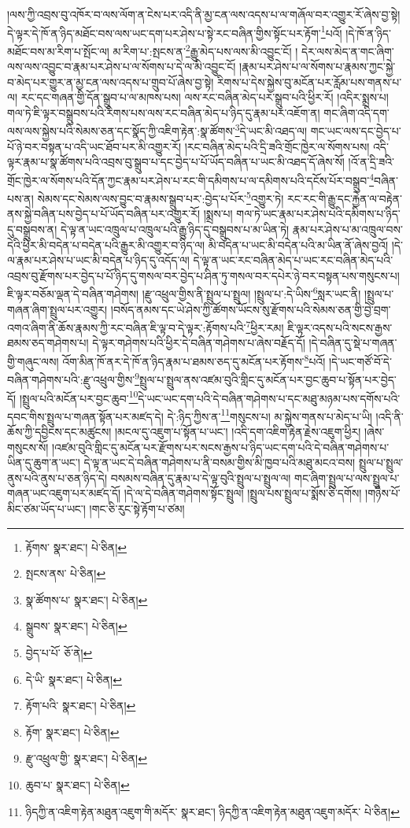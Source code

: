 །ལས་ཀྱི་འབྲས་བུ་འཁོར་བ་ལས་ལོག་ན་ངེས་པར་འདི་ནི་མྱ་ངན་ལས་འདས་པ་ལ་གཞོལ་བར་འགྱུར་རོ་ཞེས་བྱ་སྟེ། དེ་ལྟར་དེ་ཁོ་ན་ཉིད་མཐོང་བས་ལས་ཡང་དག་པར་ཤེས་པ་སྟེ་རང་བཞིན་གྱིས་སྟོང་པར་རྟོག་\footnote{རྟོགས་  སྣར་ཐང་།  པེ་ཅིན། }པའོ། །དེ་ཁོ་ན་ཉིད་མཐོང་བས་མ་རིག་པ་སྤོང་ལ། མ་རིག་པ་:སྤངས་ན་\footnote{སྤངས་ནས་  པེ་ཅིན། }རྒྱུ་མེད་པས་ལས་མི་འབྱུང་ངོ། །
དེར་ལས་མེད་ན་གང་ཞིག་ལས་ལས་འབྱུང་བ་རྣམ་པར་ཤེས་པ་ལ་སོགས་པ་དེ་ལ་མི་འབྱུང་ངོ། །རྣམ་པར་ཤེས་པ་ལ་སོགས་པ་རྣམས་ཀྱང་སྐྱེ་བ་མེད་པར་གྱུར་ན་མྱ་ངན་ལས་འདས་པ་གྲུབ་པོ་ཞེས་བྱ་སྟེ། རིགས་པ་དེས་སྐྱེས་བུ་མངོན་པར་རློམ་པས་གནས་པ་ལ། རང་དང་གཞན་གྱི་དོན་སྒྲུབ་པ་ལ་མཁས་པས། ལས་རང་བཞིན་མེད་པར་སྒྲུབ་པའི་ཕྱིར་རོ། །འདིར་སྨྲས་པ། གལ་ཏེ་ཇི་ལྟར་བསྒྲུབས་པའི་རིགས་པས་ལས་རང་བཞིན་མེད་པ་ཉིད་དུ་རྣམ་པར་འཇོག་ན། གང་ཞིག་འདི་དག་ལས་ལས་སྐྱེས་པའི་སེམས་ཅན་དང་སྣོད་ཀྱི་འཇིག་རྟེན་:སྣ་ཚོགས་\footnote{སྣ་ཚོགས་པ་  སྣར་ཐང་།  པེ་ཅིན། }དེ་ཡང་མི་འཐད་ལ། གང་ཡང་ལས་དང་བྱེད་པ་པོ་ཉེ་བར་བསྟན་པ་འདི་ཡང་ཐོབ་པར་མི་འགྱུར་རོ། །རང་བཞིན་མེད་པའི་དྲི་ཟའི་གྲོང་ཁྱེར་ལ་སོགས་པས། འདི་ལྟར་རྣམ་པ་སྣ་ཚོགས་པའི་འབྲས་བུ་སྒྲུབ་པ་དང་བྱེད་པ་པོ་ཡོད་བཞིན་པ་ཡང་མི་འཐད་དོ་ཞེས་སོ། །འོ་ན་དྲི་ཟའི་གྲོང་ཁྱེར་ལ་སོགས་པའི་དོན་ཀྱང་རྣམ་པར་ཤེས་པ་རང་གི་དམིགས་པ་ལ་དམིགས་པའི་དངོས་པོར་བསྒྲུབ་\footnote{སྒྲུབས་  སྣར་ཐང་།  པེ་ཅིན། }བཞིན་པས་ན། སེམས་དང་སེམས་ལས་བྱུང་བ་རྣམས་སྒྲུབ་པར་:བྱེད་པ་པོར་\footnote{བྱེད་པ་པོ་  ཅོ་ནེ། }འགྱུར་ཏེ། རང་རང་གི་རྒྱུ་དང་རྐྱེན་ལ་བརྟེན་ནས་སྐྱེ་བཞིན་པས་བྱེད་པ་པོ་ཡོད་བཞིན་པར་འགྱུར་རོ། །སྨྲས་པ། གལ་ཏེ་ཡང་རྣམ་པར་ཤེས་པའི་དམིགས་པ་ཉིད་དུ་བསྒྲུབས་ན། དེ་ལྟ་ན་ཡང་འཁྲུལ་པ་འཁྲུལ་པའི་རྒྱུ་ཉིད་དུ་བསྒྲུབས་པ་མ་ཡིན་ཏེ། རྣམ་པར་ཤེས་པ་མ་འཁྲུལ་བས་དེའི་ཕྱིར་མི་བདེན་པ་བདེན་པའི་རྒྱུར་མི་འགྱུར་བ་ཉིད་ལ། མི་བདེན་པ་ཡང་མི་བདེན་པའི་མ་ཡིན་ནོ་ཞེས་བྱའོ། །དེ་ལ་རྣམ་པར་ཤེས་པ་ཡང་མི་བདེན་པ་ཉིད་དུ་འདོད་ལ། དེ་ལྟ་ན་ཡང་རང་བཞིན་མེད་པ་ཡང་རང་བཞིན་མེད་པའི་འབྲས་བུ་རྫོགས་པར་བྱེད་པ་པོ་ཉིད་དུ་གསལ་བར་བྱེད་པ་ཤིན་ཏུ་གསལ་བར་དཔེར་ཉེ་བར་བསྟན་པས་གསུངས་པ། ཇི་ལྟར་བཅོམ་ལྡན་དེ་བཞིན་གཤེགས། །རྫུ་འཕྲུལ་གྱིས་ནི་སྤྲུལ་པ་སྤྲུལ། །སྤྲུལ་པ་:དེ་ཡིས་\footnote{དེ་ཡི་  སྣར་ཐང་།  པེ་ཅིན། }སླར་ཡང་ནི། །སྤྲུལ་པ་གཞན་ཞིག་སྤྲུལ་པར་འགྱུར། །བསོད་ནམས་དང་ཡེ་ཤེས་ཀྱི་ཚོགས་ཡོངས་སུ་རྫོགས་པའི་སེམས་ཅན་གྱི་བྱེ་བྲག་འགའ་ཞིག་ནི་ཆོས་རྣམས་ཀྱི་རང་བཞིན་ཇི་ལྟ་བ་དེ་ལྟར་:རྟོགས་པའི་\footnote{རྟོག་པའི་  སྣར་ཐང་།  པེ་ཅིན། }ཕྱིར་རམ། ཇི་ལྟར་འདས་པའི་སངས་རྒྱས་ཐམས་ཅད་གཤེགས་པ། དེ་ལྟར་གཤེགས་པའི་ཕྱིར་དེ་བཞིན་གཤེགས་པ་ཞེས་བརྗོད་དོ། །དེ་བཞིན་དུ་སྡེ་པ་གཞན་གྱི་གཞུང་ལས། འོག་མིན་ཁོ་ནར་དེ་ཁོ་ན་ཉིད་རྣམ་པ་ཐམས་ཅད་དུ་མངོན་པར་རྟོགས་\footnote{རྟོག་  སྣར་ཐང་།  པེ་ཅིན། }པའོ། །དེ་ཡང་གཙོ་བོ་དེ་བཞིན་གཤེགས་པའི་:རྫུ་འཕྲུལ་གྱིས་\footnote{རྫུ་འཕྲུལ་གྱི་  སྣར་ཐང་།  པེ་ཅིན། }སྤྲུལ་པ་སྤྲུལ་ནས་འཛམ་བུའི་གླིང་དུ་མངོན་པར་བྱང་ཆུབ་པ་སྟོན་པར་བྱེད་དོ། །སྤྲུལ་པའི་མངོན་པར་བྱང་ཆུབ་\footnote{ཆུབ་པ་  སྣར་ཐང་།  པེ་ཅིན། }དེ་ཡང་ཡང་དག་པའི་དེ་བཞིན་གཤེགས་པ་དང་མཐུ་མཉམ་པས་དགོས་པའི་དབང་གིས་སྤྲུལ་པ་གཞན་སྟོན་པར་མཛད་དེ། དེ་:ཉིད་ཀྱིས་ན་\footnote{ཉིདཀྱི་ན་འཇིག་རྟེན་མཐུན་འཇུག་གི་མདོར་  སྣར་ཐང་། ཉིདཀྱི་ན་འཇིག་རྟེན་མཐུན་འཇུག་མདོར་  པེ་ཅིན། }གསུངས་པ། མ་སྐྱེས་གནས་པ་མེད་པ་ཡི། །འདི་ནི་ཆོས་ཀྱི་དབྱིངས་དང་མཚུངས། །མངལ་དུ་འཇུག་པ་སྟོན་པ་ཡང་། །འདི་དག་འཇིག་རྟེན་རྗེས་འཇུག་ཕྱིར། །ཞེས་གསུངས་སོ། །འཛམ་བུའི་གླིང་དུ་མངོན་པར་རྫོགས་པར་སངས་རྒྱས་པ་ཉིད་ཡང་དག་པའི་དེ་བཞིན་གཤེགས་པ་ཡིན་དུ་ཆུག་ན་ཡང་། དེ་ལྟ་ན་ཡང་དེ་བཞིན་གཤེགས་པ་ནི་བསམ་གྱིས་མི་ཁྱབ་པའི་མཐུ་མངའ་བས། སྤྲུལ་པ་སྤྲུལ་ནུས་པའི་ནུས་པ་ཅན་ཉིད་དེ། བསམས་བཞིན་དུ་རྣམ་པ་དེ་ལྟ་བུའི་སྤྲུལ་པ་སྤྲུལ་ལ། གང་ཞིག་སྤྲུལ་པ་ལས་སྤྲུལ་པ་གཞན་ཡང་འཇུག་པར་མཛད་དོ། །དེ་ལ་དེ་བཞིན་གཤེགས་སྟོང་སྤྲུལ། །སྤྲུལ་པས་སྤྲུལ་པ་སྨོས་ཅི་དགོས། །གཉིས་པོ་མིང་ཙམ་ཡོད་པ་ཡང་། །གང་ཅི་རུང་སྟེ་རྟོག་པ་ཙམ། 